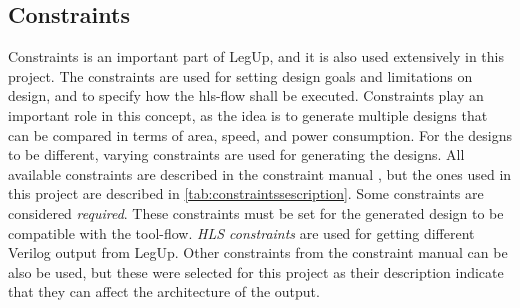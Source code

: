 \subsection{\label{subsec:legupconstraintstheory}Constraints}
Constraints is an important part of LegUp, and it is also used extensively in this project. The constraints are used for setting design goals and limitations on design, and to specify how the \gls{hls}-flow shall be executed. Constraints play an important role in this concept, as the idea is to generate multiple designs that can be compared in terms of area, speed, and power consumption. For the designs to be different, varying constraints are used for generating the designs. All available constraints are described in the constraint manual \cite{legupconst}, but the ones used in this project are described in \cref{tab:constraintssescription}. Some constraints are considered \textit{required}. These constraints must be set for the generated design to be compatible with the tool-flow. \textit{HLS constraints} are used for getting different Verilog output from LegUp. Other constraints from the constraint manual can be also be used, but these were selected for this project as their description indicate that they can affect the architecture of the output.
